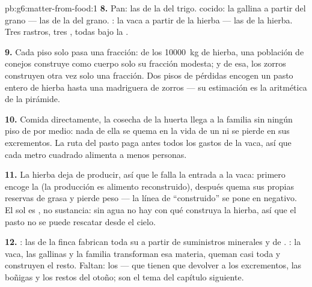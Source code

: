 \begin{solution}{pb:g6:matter-from-food:1}
\textbf{8.} Pan: las  de la  del trigo.  cocido: la
gallina a partir del grano --- las  de la  del grano. :
la vaca a partir de la hierba --- las  de la hierba. Tres rastros,
tres , todas bajo la .

\textbf{9.} Cada piso solo pasa una fracción: de los \qty{10000}{kg} de
hierba, una población de conejos construye como cuerpo solo su fracción
modesta; y de esa, los zorros construyen otra vez solo una fracción.
Dos pisos de pérdidas encogen un pasto entero de hierba hasta una
madriguera de zorros --- su estimación es la aritmética de la pirámide.

\textbf{10.} Comida directamente, la cosecha de la huerta llega a la
familia sin ningún piso de  por medio: nada de ella se
quema en la vida de un  ni se pierde en sus excrementos. La ruta
del pasto paga antes todos los gastos de la vaca, así que cada metro
cuadrado alimenta a menos personas.

\textbf{11.} La hierba deja de producir, así que le falla la entrada a
la vaca: primero encoge la  (la producción es alimento
reconstruido), después quema sus propias reservas de grasa y pierde
peso --- la línea de ``construido'' se pone en negativo. El sol es
, no sustancia: sin agua no hay con qué construya la hierba, así
que el pasto no se puede rescatar desde el cielo.

\textbf{12.} : las  de la finca fabrican toda su
 a partir de suministros minerales y de .
: la vaca, las gallinas y la familia transforman esa
materia, queman casi toda y construyen el resto. Faltan: los
 --- que tienen que devolver a  los
excrementos, las boñigas y los restos del otoño; son el tema del
capítulo siguiente.
\end{solution}
